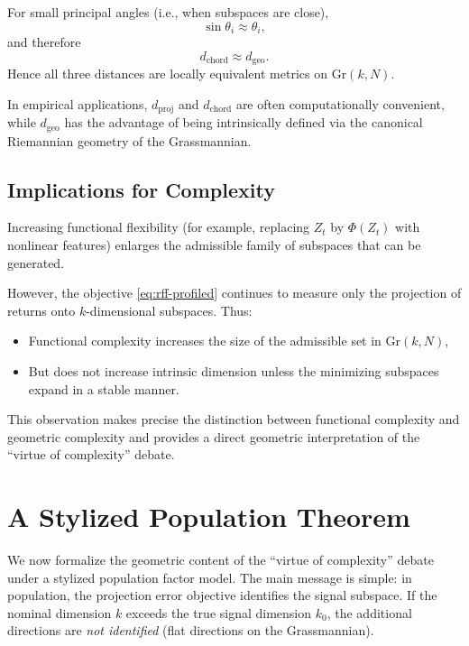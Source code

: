 \documentclass[twoside,11pt,letter]{article}
\begin{document}
For small principal angles (i.e., when subspaces are close),
\begin{equation*}
\sin\theta_i \approx \theta_i,
\end{equation*}
and therefore
\begin{equation*}
d_{\mathrm{chord}} \approx d_\mathrm{{geo}}.
\end{equation*}
Hence all three distances are locally equivalent metrics on $\mathrm{Gr}(k,N)$.

In empirical applications, $d_{\mathrm{proj}}$ and $d_{\mathrm{chord}}$ are often computationally convenient, while $d_\mathrm{{geo}}$ has the advantage of being intrinsically defined via the canonical Riemannian geometry of the Grassmannian.

\subsection{Implications for Complexity}

Increasing functional flexibility (for example, replacing $Z_t$ by $\Phi(Z_t)$ with nonlinear features) enlarges the admissible family of subspaces that can be generated.

However, the objective \eqref{eq:rff-profiled} continues to measure only the projection of returns onto $k$-dimensional subspaces. Thus:

\begin{itemize}
\item Functional complexity increases the size of the admissible set in $\mathrm{Gr}(k,N)$,
\item But does not increase intrinsic dimension unless the minimizing subspaces expand in a stable manner.
\end{itemize}

This observation makes precise the distinction between functional complexity and geometric complexity and provides a direct geometric interpretation of the
``virtue of complexity'' debate.


\section{\label{sec:pop_setup}A Stylized Population Theorem}

We now formalize the geometric content of the ``virtue of complexity'' debate under a stylized population factor model. The main message is simple: in population, the projection error objective identifies the signal subspace. If the nominal dimension $k$ exceeds the true signal dimension $k_0$, the additional directions are \emph{not identified} (flat directions on the Grassmannian).
\end{document}
